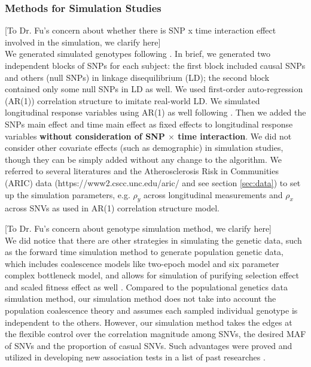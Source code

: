 \documentclass[12pt]{article}
\begin{document}
\subsubsection{Methods for Simulation Studies}\label{sec:subsub1-2}
[To Dr. Fu's concern about whether there is SNP x time interaction effect involved in the simulation, we clarify here]\\
We generated simulated genotypes following \cite{Wang2007,Pan2009,Basu2011}. In brief,
we generated two independent blocks of SNPs for each subject: the
first block included causal SNPs and others (null SNPs) in linkage
disequilibrium (LD); the second block contained only some null SNPs in LD as well. We used first-order auto-regression (AR(1)) correlation structure to imitate real-world LD. We simulated longitudinal response variables using AR(1) as well following \cite{Song2013}. Then we added the SNPs main effect and time main effect as fixed effects to longitudinal response variables \textbf{without consideration of SNP $\times$ time interaction}. We did not consider other covariate effects (such as demographic) in simulation studies, though they can be simply added without any change to the algorithm. We referred to several literatures \cite{pan2014powerful,Basu2011,Pan2011,Han2010,Pan2009} and the Atherosclerosis Risk in Communities (ARIC) data (https://www2.cscc.unc.edu/aric/ and see section \ref{sec:data}) to set up the simulation parameters, e.g. $\rho_y$ across longitudinal measurements and $\rho_x$ across SNVs as used in AR(1) correlation structure model.

[To Dr. Fu's concern about genotype simulation method, we clarify here]\\
We did notice that there are other strategies in simulating the genetic data, such as the forward time simulation method to generate population genetic data, which includes coalescence models like two-epoch model and six parameter complex bottleneck model, and allows for simulation of purifying selection effect and scaled fitness effect as well \cite{Boyko2008,Hernandez2008}. Compared to the populational genetics data simulation method, our simulation method does not take into account the population coalescence theory and assumes each sampled individual genotype is independent to the others. However, our simulation method takes the edges at the flexible control over the correlation magnitude among SNVs, the desired MAF of SNVs and the proportion of casual SNVs. Such advantages were proved and utilized in developing new association tests in a list of past researches \cite{Wang2007,Pan2009,Han2010,Pan2011,Basu2011,pan2014powerful,zhang2014testing}. 
\end{document}
